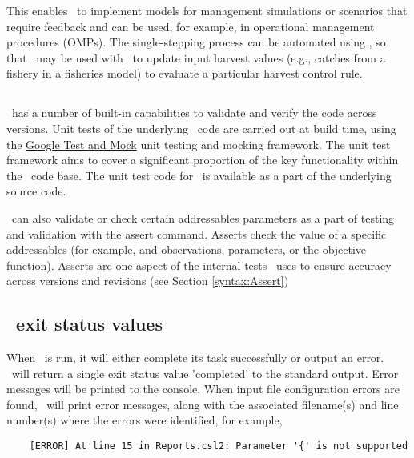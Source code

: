 This enables \CNAME\ to implement models for management simulations or scenarios that require feedback and can be used, for example, in operational management procedures (OMPs). The single-stepping process can be automated using \R, so that \CNAME\ may be used with \R\ to update input harvest values (e.g., catches from a fishery in a fisheries model) to evaluate a particular harvest control rule.

\subsection{}\label{sec:Assert}

\CNAME\ has a number of built-in capabilities to validate and verify the code across versions. Unit tests of the underlying \CNAME\ code are carried out at build time, using the \href{https://github.com/google/googletest}{Google Test and Mock} unit testing and mocking framework. The unit test framework aims to cover a significant proportion of the key functionality within the \CNAME\ code base. The unit test code for \CNAME\ is available as a part of the underlying source code.

\CNAME\ can also validate or check certain addressables parameters as a part of testing and validation with the assert command. Asserts check the value of a specific addressables (for example, and observations, parameters, or the objective function). Asserts are one aspect of the internal tests \CNAME\ uses to ensure accuracy across versions and revisions (see Section \ref{syntax:Assert})

\subsection{\CNAME\ exit status values}

When \CNAME\ is run, it will either complete its task successfully or output an error. \CNAME\ will return a single exit status value 'completed' to the standard output. Error messages will be printed to the console. When input file configuration errors are found, \CNAME\ will print error messages, along with the associated filename(s) and line number(s) where the errors were identified, for example,

{\small{\begin{verbatim}
	[ERROR] At line 15 in Reports.csl2: Parameter '{' is not supported
\end{verbatim}}}
